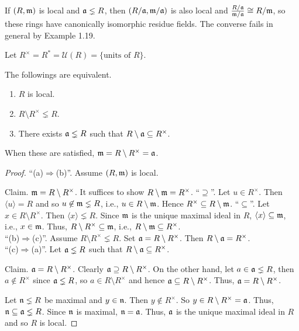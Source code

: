 \begin{fact}
    If $(R,\mathfrak{m})$ is local and $\mathfrak{a} \lneq R$, then $(R/\mathfrak{a},\mathfrak{m}/\mathfrak{a})$ is also local and $\frac{R/\mathfrak{a}}{\mathfrak{m}/\mathfrak{a}} \cong R/\mathfrak{m}$, so these rings have canonically isomorphic residue fields. The converse fails in general by Example 1.19. 
\end{fact}

\begin{notation}
    Let $R^\times = R^* =  \mathcal U(R) = \{\text{units of }R\}$.
\end{notation}

\begin{proposition}
    The followings are equivalent.
    \begin{enumerate}
        \item $R$ is local.
        \item $R \setminus R^\times \lneq R$.
        \item There exists $\mathfrak{a} \lneq R$ such that $R \setminus \mathfrak{a} \subseteq R^\times$.
    \end{enumerate}
    When these are satisfied, $\mathfrak{m} = R \setminus R^\times = \mathfrak{a}$.
\end{proposition}

\begin{proof}
    ``(a)$\Rightarrow$(b)''. Assume $(R,\mathfrak{m})$ is local. \par
    Claim. $\mathfrak{m} = R \setminus R^\times$. It suffices to show $R \setminus \mathfrak{m} = R^\times$. ``$\supseteq$''. Let $u \in R^\times$. Then $\langle u \rangle = R$ and so $u \not \in \mathfrak{m} \lneq R$, i.e., $u \in R \setminus \mathfrak{m}$. Hence $R^\times \subseteq R \setminus \mathfrak{m}$. ``$\subseteq$''. Let $x \in R \setminus R^\times$. Then $\langle x \rangle \lneq R$. Since $\mathfrak{m}$ is the unique maximal ideal in $R$, $\langle x \rangle \subseteq \mathfrak{m}$, i.e., $x \in \mathfrak{m}$. Thus, $R \setminus R^\times \subseteq \mathfrak{m}$, i.e., $R \setminus \mathfrak{m} \subseteq R^\times$. \\
    ``(b)$\Rightarrow$(c)''. Assume $R \setminus R^\times \lneq R$. Set $\mathfrak{a} = R \setminus R^\times$. Then $R \setminus \mathfrak{a} = R^\times$. \\
    ``(c)$\Rightarrow$(a)''. Let $\mathfrak{a} \lneq R$ such that $R \setminus \mathfrak{a} \subseteq R^\times $. \par
    Claim. $\mathfrak{a} = R \setminus R^\times$. Clearly $\mathfrak{a} \supseteq R \setminus R^\times$. On the other hand, let $a \in \mathfrak{a} \lneq R$, then $a \not \in R^\times$ since $\mathfrak{a} \lneq R$, so $a \in R \setminus R^\times$ and hence $\mathfrak{a} \subseteq R \setminus R^\times$. Thus, $\mathfrak{a} = R \setminus R^\times$. \par
    Let $\mathfrak{n} \lneq R$ be maximal and $y \in \mathfrak{n}$. Then $y \not \in R^\times$. So $y \in R \setminus R^\times = \mathfrak{a}$. Thus, $\mathfrak{n} \subseteq \mathfrak{a} \lneq R$. Since $\mathfrak{n}$ is maximal, $\mathfrak{n} = \mathfrak{a}$. Thus, $\mathfrak{a}$ is the unique maximal ideal in $R$ and so $R$ is local.
\end{proof}

